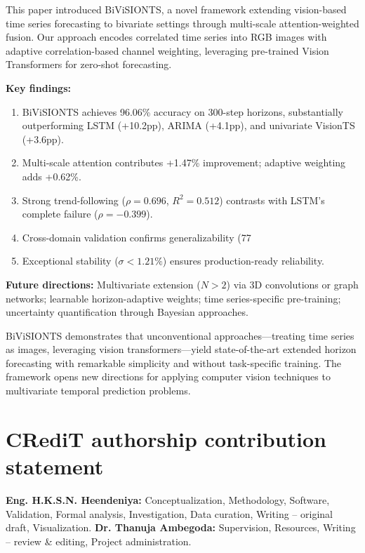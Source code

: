 \documentclass[preprint,12pt,authoryear]{elsarticle}
\begin{document}
This paper introduced BiViSIONTS, a novel framework extending vision-based time series forecasting to bivariate settings through multi-scale attention-weighted fusion. Our approach encodes correlated time series into RGB images with adaptive correlation-based channel weighting, leveraging pre-trained Vision Transformers for zero-shot forecasting.

\textbf{Key findings:}
\begin{enumerate}
    \item BiViSIONTS achieves 96.06\% accuracy on 300-step horizons, substantially outperforming LSTM (+10.2pp), ARIMA (+4.1pp), and univariate VisionTS (+3.6pp).
    \item Multi-scale attention contributes +1.47\% improvement; adaptive weighting adds +0.62\%.
    \item Strong trend-following ($\rho=0.696$, $R^2=0.512$) contrasts with LSTM's complete failure ($\rho=-0.399$).
    \item Cross-domain validation confirms generalizability (77%
    \item Exceptional stability ($\sigma<1.21\%$) ensures production-ready reliability.
\end{enumerate}

\textbf{Future directions:} Multivariate extension ($N>2$) via 3D convolutions or graph networks; learnable horizon-adaptive weights; time series-specific pre-training; uncertainty quantification through Bayesian approaches.

BiViSIONTS demonstrates that unconventional approaches—treating time series as images, leveraging vision transformers—yield state-of-the-art extended horizon forecasting with remarkable simplicity and without task-specific training. The framework opens new directions for applying computer vision techniques to multivariate temporal prediction problems.


\section*{CRediT authorship contribution statement}

\textbf{Eng. H.K.S.N. Heendeniya:} Conceptualization, Methodology, Software, Validation, Formal analysis, Investigation, Data curation, Writing – original draft, Visualization.
\textbf{Dr. Thanuja Ambegoda:} Supervision, Resources, Writing – review \& editing, Project administration.
\end{document}

